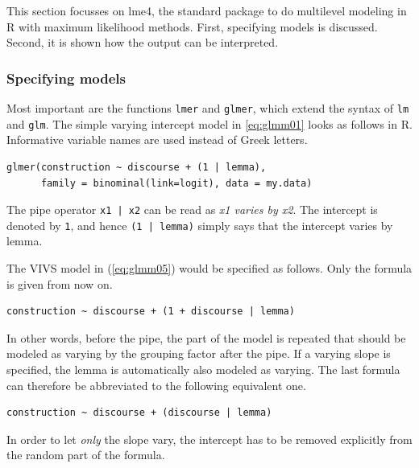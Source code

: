 \documentclass[a4paper,12pt]{article}
\begin{document}
This section focusses on lme4, the standard package to do multilevel modeling in R with maximum likelihood methods.
First, specifying models is discussed.
Second, it is shown how the output can be interpreted.

\subsubsection{Specifying models}
\label{sec:specifyingmodels}

Most important are the functions \texttt{lmer} and \texttt{glmer}, which extend the syntax of \texttt{lm} and \texttt{glm}.
The simple varying intercept model in \ref{eq:glmm01} looks as follows in R.
Informative variable names are used instead of Greek letters.

\vspace{0.5\baselineskip}

\begin{lstlisting}[frame=trbl]
glmer(construction ~ discourse + (1 | lemma),
      family = binominal(link=logit), data = my.data)
\end{lstlisting}

The pipe operator \texttt{x1 | x2} can be read as \textit{x1 varies by x2}.
The intercept is denoted by \texttt{1}, and hence \texttt{(1 | lemma)} simply says that the intercept varies by lemma.

The VIVS model in (\ref{eq:glmm05}) would be specified as follows.
Only the formula is given from now on.

\vspace{0.5\baselineskip}

\begin{lstlisting}[frame=trbl]
construction ~ discourse + (1 + discourse | lemma)
\end{lstlisting}

In other words, before the pipe, the part of the model is repeated that should be modeled as varying by the grouping factor after the pipe.
If a varying slope is specified, the lemma is automatically also modeled as varying. 
The last formula can therefore be abbreviated to the following equivalent one.

\vspace{0.5\baselineskip}

\begin{lstlisting}[frame=trbl]
construction ~ discourse + (discourse | lemma)
\end{lstlisting}

In order to let \textit{only} the slope vary, the intercept has to be removed explicitly from the random part of the formula.
\end{document}
